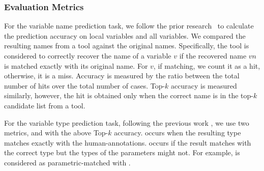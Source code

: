 
\subsubsection*{Evaluation Metrics}

For the variable name prediction task, we follow the prior
research~\cite{icse19} to calculate the prediction accuracy on local
variables and all variables. We compared the resulting names from a
tool against the original names. Specifically, the tool is considered
to correctly recover the name of a variable $v$ if the recovered name
$vn$ is matched exactly with its original name. For $v$, if matching,
we count it as a hit, otherwise, it is a miss. Accuracy is measured by
the ratio between the total number of hits over the total number of
cases. Top-$k$ accuracy is measured similarly, however, the hit is
obtained only when the correct name is in the top-$k$ candidate list
from a tool.

For the variable type prediction task, following the previous
work \cite{type-graph-icse22}, we use two metrics, 
and
 with the above Top-$k$ accuracy. 
occurs when the resulting type matches exactly with the
human-annotations.  occurs if the result
matches with the correct type but the types of the parameters might
not. For example,  is considered as
parametric-matched with .


